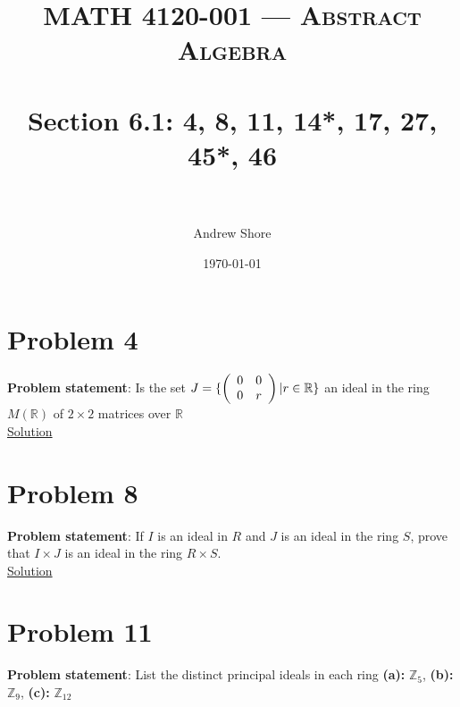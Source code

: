 \documentclass{article} %
\title{ 
\normalfont \normalsize 
\textsc{MATH 4120-001 --- Abstract Algebra} \\
\horrule{0.5pt} \\[0cm] %
\huge Section  6.1: 4, 8, 11, 14*, 17, 27, 45*, 46\\ %
\horrule{2pt} \\[0cm] %
}
\author{Andrew Shore} %
\date{\normalsize\today} %
\begin{document}
\maketitle %

\section*{Problem 4}


\textbf{Problem statement}: Is the set $J = \{\left( \begin{array}{c c} 0 & 0 \\ 0 & r\end{array}\right)| r \in \mathbb{R}\}$ an ideal in the ring $M(\mathbb{R})$ of $2\times2$ matrices over $\mathbb{R}$
\\

\underline{Solution}
\begin{addmargin}[1em]{0em}

\end{addmargin}

\newpage
\section*{Problem 8}


\textbf{Problem statement}: If $I$ is an ideal in $R$ and $J$ is an ideal in the ring $S$, prove that $I\times J$ is an ideal in the ring $R\times S$.
\\

\underline{Solution}
\begin{addmargin}[1em]{0em}

\end{addmargin}

\newpage

\section*{Problem 11}


\textbf{Problem statement}: List the distinct principal ideals in each ring \textbf{(a):} $\mathbb{Z}_5$, \textbf{(b):} $\mathbb{Z}_9$, \textbf{(c):} $\mathbb{Z}_12$
\\
\end{document}
